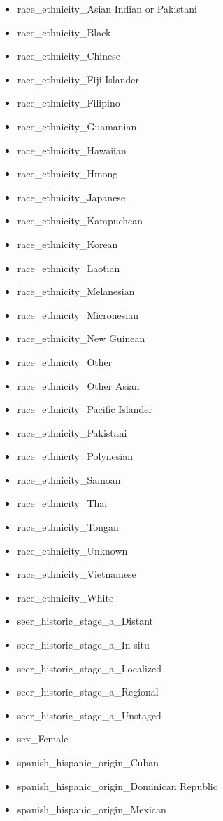 \documentclass[a4paper,11pt]{article}
\begin{document}
\begin{itemize}[noitemsep]
\item race\_ethnicity\_Asian Indian or Pakistani
\item race\_ethnicity\_Black
\item race\_ethnicity\_Chinese
\item race\_ethnicity\_Fiji Islander
\item race\_ethnicity\_Filipino
\item race\_ethnicity\_Guamanian
\item race\_ethnicity\_Hawaiian
\item race\_ethnicity\_Hmong
\item race\_ethnicity\_Japanese
\item race\_ethnicity\_Kampuchean
\item race\_ethnicity\_Korean
\item race\_ethnicity\_Laotian
\item race\_ethnicity\_Melanesian
\item race\_ethnicity\_Micronesian
\item race\_ethnicity\_New Guinean
\item race\_ethnicity\_Other
\item race\_ethnicity\_Other Asian
\item race\_ethnicity\_Pacific Islander
\item race\_ethnicity\_Pakistani
\item race\_ethnicity\_Polynesian
\item race\_ethnicity\_Samoan
\item race\_ethnicity\_Thai
\item race\_ethnicity\_Tongan
\item race\_ethnicity\_Unknown
\item race\_ethnicity\_Vietnamese
\item race\_ethnicity\_White
\item seer\_historic\_stage\_a\_Distant
\item seer\_historic\_stage\_a\_In situ
\item seer\_historic\_stage\_a\_Localized
\item seer\_historic\_stage\_a\_Regional
\item seer\_historic\_stage\_a\_Unstaged
\item sex\_Female
\item spanish\_hispanic\_origin\_Cuban
\item spanish\_hispanic\_origin\_Dominican Republic
\item spanish\_hispanic\_origin\_Mexican

\end{itemize}
\end{document}
